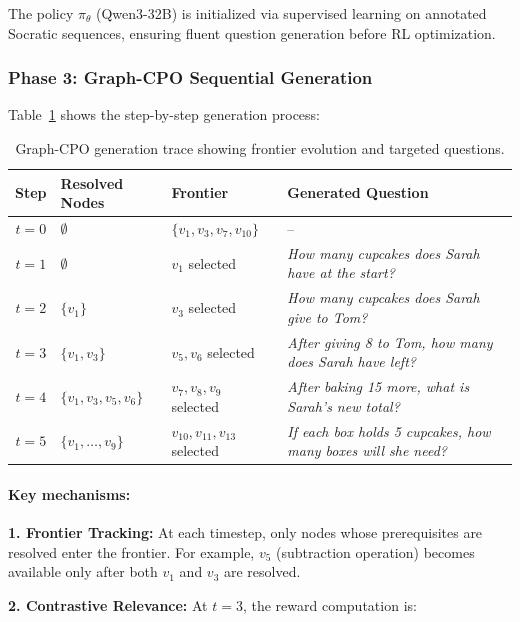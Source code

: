 \documentclass[sigconf, anonymous, review, screen]{acmart}
\begin{document}
The policy $\pi_\theta$ (Qwen3-32B) is initialized via supervised learning on annotated Socratic sequences, ensuring fluent question generation before RL optimization.

\subsubsection{Phase 3: Graph-CPO Sequential Generation}

Table~\ref{tab:example_generation} shows the step-by-step generation process:

\begin{table}[t]
\centering
\small
\caption{Graph-CPO generation trace showing frontier evolution and targeted questions.}
\label{tab:example_generation}
\begin{tabularx}{\textwidth}{cXlX}
\toprule
\textbf{Step} & \textbf{Resolved Nodes} & \textbf{Frontier} & \textbf{Generated Question} \\
\midrule
$t=0$ & $\emptyset$ & $\{v_1, v_3, v_7, v_{10}\}$ & -- \\
\midrule
$t=1$ & $\emptyset$ & $v_1$ selected & \textit{How many cupcakes does Sarah have at the start?} \\
\midrule
$t=2$ & $\{v_1\}$ & $v_3$ selected & \textit{How many cupcakes does Sarah give to Tom?} \\
\midrule
$t=3$ & $\{v_1, v_3\}$ & $v_5, v_6$ selected & \textit{After giving 8 to Tom, how many does Sarah have left?} \\
\midrule
$t=4$ & $\{v_1, v_3, v_5, v_6\}$ & $v_7, v_8, v_9$ selected & \textit{After baking 15 more, what is Sarah's new total?} \\
\midrule
$t=5$ & $\{v_1, \ldots, v_9\}$ & $v_{10}, v_{11}, v_{13}$ selected & \textit{If each box holds 5 cupcakes, how many boxes will she need?} \\
\bottomrule
\end{tabularx}
\end{table}

\paragraph{Key mechanisms:}

\textbf{1. Frontier Tracking:} At each timestep, only nodes whose prerequisites are resolved enter the frontier. For example, $v_5$ (subtraction operation) becomes available only after both $v_1$ and $v_3$ are resolved.

\textbf{2. Contrastive Relevance:} At $t=3$, the reward computation is:
\end{document}
